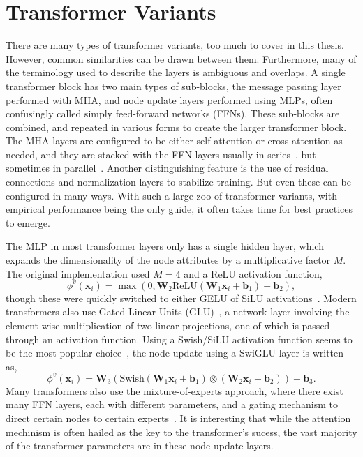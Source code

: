 \section{Transformer Variants}

There are many types of transformer variants, too much to cover in this thesis.
However, common similarities can be drawn between them.
Furthermore, many of the terminology used to describe the layers is ambiguous and overlaps.
A single transformer block has two main types of sub-blocks, the message passing layer performed with MHA, and node update layers performed using MLPs, often confusingly called simply feed-forward networks (FFNs).
These sub-blocks are combined, and repeated in various forms to create the larger transformer block.
The MHA layers are configured to be either self-attention or cross-attention as needed, and they are stacked with the FFN layers usually in series~, but sometimes in parallel~.
Another distinguishing feature is the use of residual connections and normalization layers to stabilize training.
But even these can be configured in many ways.
With such a large zoo of transformer variants, with empirical performance being the only guide, it often takes time for best practices to emerge.

The MLP in most transformer layers only has a single hidden layer, which expands the dimensionality of the node attributes by a multiplicative factor $M$.
The original implementation used $M=4$ and a ReLU activation function,
\begin{equation}
    \phi^v(\mathbf{x}_i) = \max\left(0, \mathbf{W}_2 \text{ReLU}(\mathbf{W}_1 \mathbf{x}_i + \mathbf{b}_1) + \mathbf{b}_2\right),
\end{equation}
though these were quickly switched to either GELU of SiLU activations~.
Modern transformers also use Gated Linear Units (GLU)~, a network layer involving the element-wise multiplication of two linear projections, one of which is passed through an activation function.
Using a Swish/SiLU activation function seems to be the most popular choice~, the node update using a SwiGLU layer is written as,
\begin{equation}
    \phi^v(\mathbf{x}_i) = \mathbf{W}_3(\text{Swish}(\mathbf{W}_1 \mathbf{x}_i + \mathbf{b}_1) \otimes (\mathbf{W}_2 \mathbf{x}_i + \mathbf{b}_2)) + \mathbf{b}_3.
\end{equation}
Many transformers also use the mixture-of-experts approach, where there exist many FFN layers, each with different parameters, and a gating mechanism to direct certain nodes to certain experts~.
It is interesting that while the attention mechinism is often hailed as the key to the transformer's sucess, the vast majority of the transformer parameters are in these node update layers.

